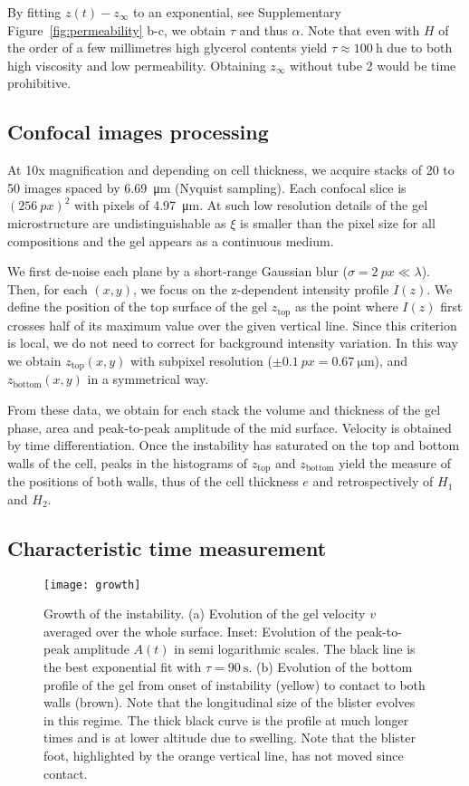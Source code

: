\documentclass[twocolumn,superscriptaddress,showpacs,preprintnumbers,
amsmath,amssymb,prl]{revtex4-1}
\begin{document}
By fitting $z(t)-z_\infty$ to an exponential, see Supplementary Figure~\ref{fig:permeability} b-c, we obtain $\tau$ and thus $\alpha$. Note that even with $H$ of the order of a few millimetres high glycerol contents yield $\tau\approx \SI{100}{\hour}$ due to both high viscosity and low permeability. Obtaining $z_\infty$ without tube 2 would be time prohibitive.



\subsection*{Confocal images processing}

At 10x magnification and depending on cell thickness, we acquire stacks of 20 to 50 images spaced by \SI{6.69}{\micro\metre} (Nyquist sampling). Each confocal slice is $(\SI{256}{px})^2$ with pixels of \SI{4.97}{\micro\metre}. At such low resolution details of the gel microstructure are undistinguishable as $\xi$ is smaller than the pixel size for all compositions and the gel appears as a continuous medium.

We first de-noise each plane by a short-range Gaussian blur ($\sigma=\SI{2}{px}\ll\lambda$). Then, for each $(x,y)$, we focus on the z-dependent intensity profile $I(z)$. We define the position of the top surface of the gel $z_\text{top}$ as the point where $I(z)$ first crosses half of its maximum value over the given vertical line. Since this criterion is local, we do not need to correct for background intensity variation. In this way we obtain $z_\text{top}(x,y)$ with subpixel resolution ($\pm\SI{0.1}{px}=\SI{0.67}{\micro\metre}$), and $z_\text{bottom}(x,y)$ in a symmetrical way.

From these data, we obtain for each stack the volume and thickness of the gel phase, area and peak-to-peak amplitude of the mid surface. Velocity is obtained by time differentiation. Once the instability has saturated on the top and bottom walls of the cell, peaks in the histograms of $z_\text{top}$ and $z_\text{bottom}$ yield the measure of the positions of both walls, thus of the cell thickness $e$ and retrospectively of $H_1$ and $H_2$.

\subsection*{Characteristic time measurement}
\begin{figure}
	\texttt{[image: growth]}
	\caption{Growth of the instability. (a) Evolution of the gel velocity $v$ averaged over the whole surface. Inset: Evolution of the peak-to-peak amplitude $A(t)$ in semi logarithmic scales. The black line is the best exponential fit with $\tau=\SI{90}{\second}$. (b) Evolution of the bottom profile of the gel from onset of instability (yellow) to contact to both walls (brown). Note that the longitudinal size of the blister evolves in this regime. The thick black curve is the profile at much longer times and is at lower altitude due to swelling. Note that the blister foot, highlighted by the orange vertical line, has not moved since contact.}
	\label{fig:growth}
\end{figure}
\end{document}
